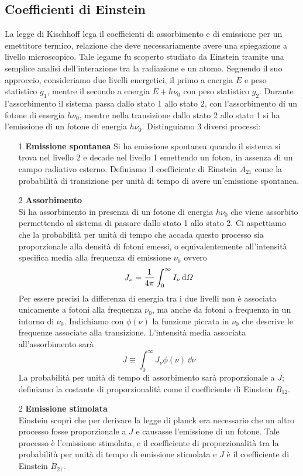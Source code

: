 \subsection{Coefficienti di Einstein}
La legge di Kischhoff lega il coefficienti di assorbimento e di emissione per un emettitore termico, relazione che deve necessariamente avere una spiegazione a livello microscopico. Tale legame fu scoperto studiato da Einstein tramite una semplice analisi dell'interazione tra la radiazione e un atomo. Seguendo il suo approccio, consideriamo due livelli energetici, il primo a energia $E$ e peso statistico $g_1$, mentre il secondo a energia $E+h\nu_0$ con peso statistico $g_2$. Durante l'assorbimento il sistema passa dallo stato 1 allo stato 2, con l'assorbimento di un fotone di energia $h\nu_0$, mentre nella transizione dallo stato 2 allo stato 1 si ha l'emissione di un fotone di energia $h\nu_0$. Distinguiamo 3 diversi processi:
\begin{itemize}
\item[1] \textbf{Emissione spontanea} Si ha emissione spontanea quando il sistema si trova nel livello 2 e decade nel livello 1 emettendo un foton, in assenza di un campo radiativo esterno. Definiamo il coefficiente di Einstein $A_{21}$ come la probabilità di transizione per unità di tempo di avere un'emissione spontanea.
\item[2] \textbf{Assorbimento} \\ Si ha assorbimento in presenza di un fotone di energia $h\nu_0$ che viene assorbito permettendo al sistema di passare dallo stato 1 allo stato 2. Ci aspettiamo che la probabilità per unità di tempo che accada questo processo sia proporzionale alla densità di fotoni emessi, o equivalentemente all'intensità specifica media alla frequenza di emissione $\nu_0$ ovvero
\begin{equation}
J_\nu = \dfrac{1}{4\pi} \int_0^\infty I_\nu \, \mathrm{d} \Omega \label{eq:Einstein4}
\end{equation} 
Per essere precisi la differenza di energia tra i due livelli non è associata unicamente a fotoni alla frequenza $\nu_0$, ma anche da fotoni a frequenza in un intorno di $\nu_0$. Indichiamo con $\phi(\nu)$ la funzione piccata in $\nu_0$ che descrive le frequenze associate alla transizione. L'intensità media associata all'assorbimento sarà 
\begin{equation}
 J \equiv \int_0^\infty J_\nu \phi (\nu) \, \dd \nu \label{eq:Einstein3}
\end{equation}
La probabilità per unità di tempo di assorbimento sarà proporzionale a $J$; definiamo la costante di proporzionalità come il coefficiente di Einstein $B_{12}$.
\item[2] \textbf{Emissione stimolata}  \\ Einstein scoprì che per derivare la legge di planck era necessario che un altro processo fosse proporzionale a $J$ e causasse l'emissione di un fotone. Tale processo è l'emissione stimolata, e il coefficiente di proporzionalità tra la probabilità per unità di tempo di emissione stimolata e $J$ è il coefficiente di Einstein $B_{21}$.
\end{itemize}
